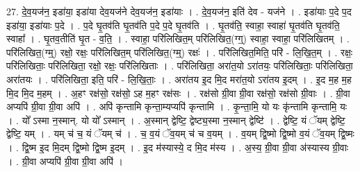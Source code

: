\documentclass[17pt]{extarticle}
\begin{document}
27. दे॒व॒यज॑न॒ इडा॑या॒ इडा॑या देव॒यज॑ने देव॒यज॑न॒ इडा॑याः । . दे॒व॒यज॑न॒ इति॑ देव - यज॑ने । . इडा॑याः प॒दे प॒द इडा॑या॒ इडा॑याः प॒दे । . प॒दे घृ॒तव॑ति घृ॒तव॑ति प॒दे प॒दे घृ॒तव॑ति । . घृ॒तव॑ति॒ स्वाहा॒ स्वाहा॑ घृ॒तव॑ति घृ॒तव॑ति॒ स्वाहा᳚ । . घृ॒तव॒तीति॑ घृ॒त - व॒ति॒ । . स्वाहा॒ परि॑लिखित॒म् परि॑लिखित॒(ग्ग्॒) स्वाहा॒ स्वाहा॒ परि॑लिखितम् । . परि॑लिखित॒(ग्म्॒) रक्षो॒ रक्षः॒ परि॑लिखित॒म् परि॑लिखित॒(ग्म्॒) रक्षः॑ । . परि॑लिखित॒मिति॒ परि॑ - लि॒खि॒त॒म् । . रक्षः॒ परि॑लिखिताः॒ परि॑लिखिता॒ रक्षो॒ रक्षः॒ परि॑लिखिताः । . परि॑लिखिता॒ अरा॑त॒यो ऽरा॑तयः॒ परि॑लिखिताः॒ परि॑लिखिता॒ अरा॑तयः । . परि॑लिखिता॒ इति॒ परि॑ - लि॒खि॒ताः॒ । . अरा॑तय इ॒द मि॒द मरा॑त॒यो ऽरा॑तय इ॒दम् । . इ॒द म॒ह म॒ह मि॒द मि॒द म॒हम् । . अ॒हꣳ रक्ष॑सो॒ रक्ष॑सो॒ ऽह म॒हꣳ रक्ष॑सः । . रक्ष॑सो ग्री॒वा ग्री॒वा रक्ष॑सो॒ रक्ष॑सो ग्री॒वाः । . ग्री॒वा अप्यपि॑ ग्री॒वा ग्री॒वा अपि॑ । . अपि॑ कृन्तामि कृन्ता॒म्यप्यपि॑ कृन्तामि । . कृ॒न्ता॒मि॒ यो यः कृ॑न्तामि कृन्तामि॒ यः । . यो᳚ ऽस्मा न॒स्मान्. यो यो᳚ ऽस्मान् । . अ॒स्मान् द्वेष्टि॒ द्वेष्ट्य॒स्मा न॒स्मान् द्वेष्टि॑ । . द्वेष्टि॒ यं ॅयम् द्वेष्टि॒ द्वेष्टि॒ यम् । . यम् च॑ च॒ यं ॅयम् च॑ । . च॒ व॒यं ॅव॒यम् च॑ च व॒यम् । . व॒यम् द्वि॒ष्मो द्वि॒ष्मो व॒यं ॅव॒यम् द्वि॒ष्मः । . द्वि॒ष्म इ॒द मि॒दम् द्वि॒ष्मो द्वि॒ष्म इ॒दम् । . इ॒द म॑स्यास्ये॒ द मि॒द म॑स्य । . अ॒स्य॒ ग्री॒वा ग्री॒वा अ॑स्यास्य ग्री॒वाः । . ग्री॒वा अप्यपि॑ ग्री॒वा ग्री॒वा अपि॑ । \newline
\end{document}
